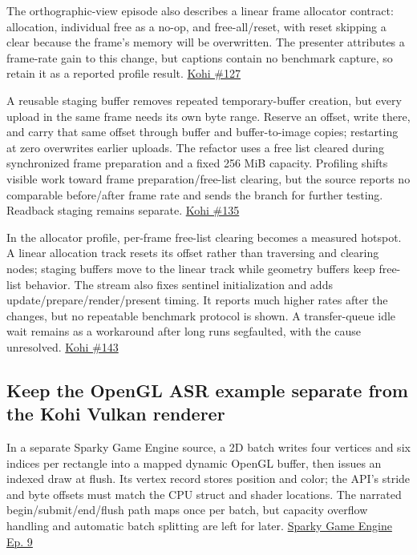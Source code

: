 The orthographic-view episode also describes a linear frame allocator contract: allocation, individual free as a no-op, and free-all/reset, with reset skipping a clear because the frame's memory will be overwritten. The presenter attributes a frame-rate gain to this change, but captions contain no benchmark capture, so retain it as a reported profile result. \href{https://www.youtube.com/watch?v=5i66-I3x9ug}{Kohi \#127}

A reusable staging buffer removes repeated temporary-buffer creation, but every upload in the same frame needs its own byte range. Reserve an offset, write there, and carry that same offset through buffer and buffer-to-image copies; restarting at zero overwrites earlier uploads. The refactor uses a free list cleared during synchronized frame preparation and a fixed 256 MiB capacity. Profiling shifts visible work toward frame preparation/free-list clearing, but the source reports no comparable before/after frame rate and sends the branch for further testing. Readback staging remains separate. \href{https://www.youtube.com/watch?v=zdZP0uQ4Pi8}{Kohi \#135}

In the allocator profile, per-frame free-list clearing becomes a measured hotspot. A linear allocation track resets its offset rather than traversing and clearing nodes; staging buffers move to the linear track while geometry buffers keep free-list behavior. The stream also fixes sentinel initialization and adds update/prepare/render/present timing. It reports much higher rates after the changes, but no repeatable benchmark protocol is shown. A transfer-queue idle wait remains as a workaround after long runs segfaulted, with the cause unresolved. \href{https://www.youtube.com/watch?v=jLSfss8YrXE}{Kohi \#143}

\subsection{Keep the OpenGL ASR example separate from the Kohi Vulkan renderer}\label{06-engine-ii-ch026-keep-the-opengl-asr-example-separate-from-the-kohi-vulkan-renderer}

\hypertarget{06-engine-ii-ch026-keep-the-opengl-asr-example-separate-from-the-kohi-vulkan-renderer}{}

In a separate Sparky Game Engine source, a 2D batch writes four vertices and six indices per rectangle into a mapped dynamic OpenGL buffer, then issues an indexed draw at flush. Its vertex record stores position and color; the API's stride and byte offsets must match the CPU struct and shader locations. The narrated begin/submit/end/flush path maps once per batch, but capacity overflow handling and automatic batch splitting are left for later. \href{https://www.youtube.com/watch?v=ImtWD_9OAeY}{Sparky Game Engine Ep. 9}

